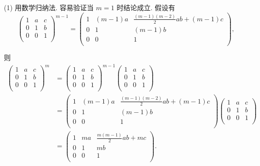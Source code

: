 \documentclass{ctexart}
\begin{document}
\begin{solution}
    (1) 用数学归纳法. 容易验证当 $m=1$ 时结论成立. 假设有
    \[\begin{pmatrix}
        1 & a & c \\
        0 & 1 & b \\
        0 & 0 & 1 \\
    \end{pmatrix}^{m-1}=\begin{pmatrix}
        1 & (m-1)a & \frac{(m-1)(m-2)}{2}ab+(m-1)c \\
        0 & 1 & (m-1)b \\
        0 & 0 & 1 \\
    \end{pmatrix},\]

    则
    \begin{align*}
        \begin{pmatrix}
            1 & a & c \\
            0 & 1 & b \\
            0 & 0 & 1 \\
        \end{pmatrix}^m & =\begin{pmatrix}
            1 & a & c \\
            0 & 1 & b \\
            0 & 0 & 1 \\
        \end{pmatrix}^{m-1}\begin{pmatrix}
            1 & a & c \\
            0 & 1 & b \\
            0 & 0 & 1 \\
        \end{pmatrix} \\
        & =\begin{pmatrix}
            1 & (m-1)a & \frac{(m-1)(m-2)}{2}ab+(m-1)c \\
            0 & 1 & (m-1)b \\
            0 & 0 & 1 \\
        \end{pmatrix}\begin{pmatrix}
            1 & a & c \\
            0 & 1 & b \\
            0 & 0 & 1 \\
        \end{pmatrix} \\
        & =\begin{pmatrix}
            1 & ma & \frac{m(m-1)}{2}ab+mc \\
            0 & 1 & mb \\
            0 & 0 & 1 \\
        \end{pmatrix}.
    \end{align*}


\end{solution}
\end{document}

